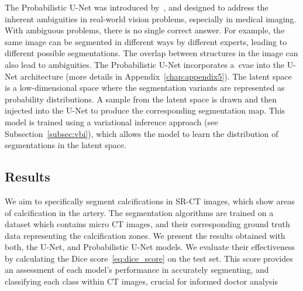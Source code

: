 The Probabilistic U-Net was introduced by~\cite{kohl2018probabilistic},
and designed
to address the inherent ambiguities in real-world vision
problems, especially in medical imaging. 
With ambiguous problems, there is no single correct answer.
For example, the same image can be
segmented in different ways by different experts, leading  to different possible
segmentations. The overlap between structures in the image can also lead to
ambiguities.
The Probabilistic U-Net  incorporates a~\gls*{cvae}
 into the U-Net 
architecture (more details in Appendix~\ref{chap:appendix5}).
The latent space is a low-dimensional space where the segmentation variants are
represented as probability distributions.
A sample from the latent space 
is drawn and then injected into the U-Net to produce the
corresponding segmentation map. This model is trained using a variational
inference approach (see Subsection~\ref{subsec:vbi}),
 which allows the model to learn the distribution of
segmentations in the latent space.


\subsection{Results}
We aim to specifically segment calcifications in SR-CT
images, which show areas of calcification in the artery. The
segmentation algorithms are trained on a dataset which contains
micro CT images, and their corresponding ground truth data representing the
calcification zones.
We present the results obtained with both, the U-Net, and Probabilistic
U-Net models. 
We evaluate their effectiveness by calculating the Dice 
score~\eqref{eq:dice_score}  on the test set.
This score provides an assessment of each model's performance in accurately
segmenting, and classifying each class within CT images, crucial for informed
doctor analysis


